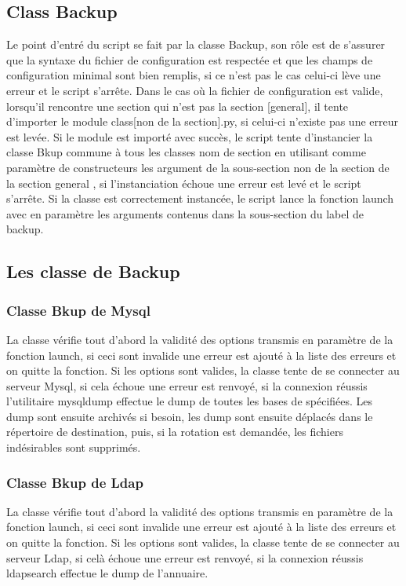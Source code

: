 \subsection*{Class Backup}
Le point d'entré du script se fait par la classe Backup, son rôle est de s'assurer que la syntaxe du fichier de configuration est respectée et que les champs de configuration minimal sont bien remplis, si ce n'est pas le cas celui-ci lève une erreur et le script s'arrête.
Dans le cas où la fichier de configuration est valide, lorsqu'il rencontre une section qui n'est pas la section [general], il tente d'importer le module class[non de la section].py, si celui-ci n'existe pas une erreur est levée.
Si le module est importé avec succès, le script tente d'instancier la classe Bkup commune à tous les classes nom de section en utilisant comme paramètre de constructeurs les argument de la sous-section  non de la section de la section general , si l'instanciation échoue une erreur est levé et le script s'arrête.
Si la classe est correctement instancée, le script lance la fonction launch avec en paramètre les arguments contenus dans la sous-section du label de backup.

\subsection*{Les classe de Backup}

\subsubsection*{Classe Bkup de Mysql}
La classe vérifie tout d'abord la validité des options transmis en paramètre de la fonction launch, si ceci sont invalide une erreur est ajouté à la liste des erreurs et on quitte la fonction.
Si les options sont valides, la classe tente de se connecter au serveur Mysql, si cela échoue une erreur est renvoyé, si la connexion réussis l'utilitaire mysqldump effectue le dump de toutes les bases de spécifiées.
Les dump sont ensuite archivés si besoin, les dump sont ensuite déplacés dans le répertoire de destination, puis, si la rotation est demandée, les fichiers indésirables sont supprimés.



\subsubsection*{Classe Bkup de Ldap}
La classe vérifie tout d'abord la validité des options transmis en paramètre de la fonction launch, si ceci sont invalide une erreur est ajouté à la liste des erreurs et on quitte la fonction.
Si les options sont valides, la classe tente de se connecter au serveur Ldap, si celà échoue une erreur est renvoyé, si la connexion réussis ldapsearch effectue le dump de l'annuaire.

